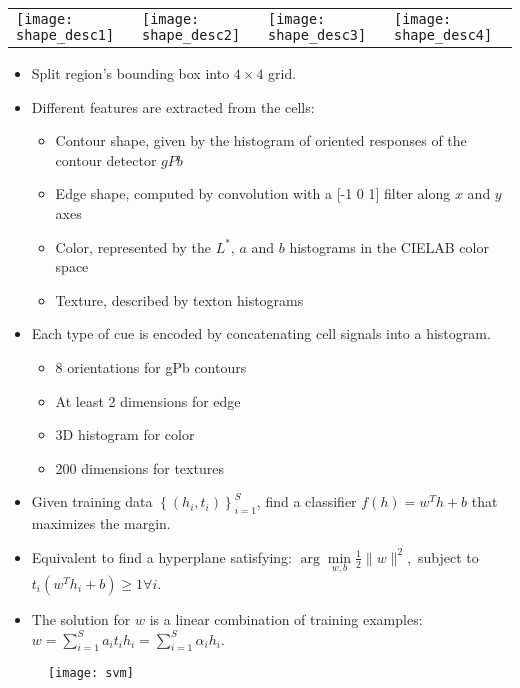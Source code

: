 \documentclass[11pt, a4paper, landscape]{article}
\begin{document}
\NewPage{}
\vfill
\begin{table}
  \centering
  \begin{tabular}{@{} M{.25\linewidth} M{.25\linewidth} M{.25\linewidth} M{.25\linewidth} @{}}
      \texttt{[image: shape\_desc1]}%
      &
      \texttt{[image: shape\_desc2]}%
      &
      \texttt{[image: shape\_desc3]}%
      &
      \texttt{[image: shape\_desc4]}%
  \end{tabular}
\end{table}
\begin{itemize}
\item Split region's bounding box into $4 \times 4$ grid.
\item Different features are extracted from the cells:
\begin{itemize}
\item Contour shape, given by the histogram of oriented responses of the contour detector $gPb$
\item Edge shape, computed by convolution with a [-1 0 1] filter along $x$ and $y$ axes
\item Color, represented by the $L^*$, $a$ and $b$ histograms in the CIELAB color space
\item Texture, described by texton histograms
\end{itemize}
\item Each type of cue is encoded by concatenating cell signals into a histogram.
\begin{itemize}
\item 8 orientations for gPb contours
\item At least 2 dimensions for edge
\item 3D histogram for color
\item 200 dimensions for textures
\end{itemize}
\end{itemize}
\vfill


\NewPage{}
\vfill
\begin{itemize}
\item Given training data $\left\lbrace (h_i, t_i) \right\rbrace _{i = 1} ^S$, find a classifier $f(h) = w^Th + b$ that maximizes the margin.
\vfill
\item Equivalent to find a hyperplane satisfying: $\arg\min\limits_{w, b} \frac{1}{2} \|w\| ^2,$ subject to $t_i(w^Th_i + b) \geq 1 \forall i$.
\vfill
\item The solution for $w$ is a linear combination of training examples: $w = \sum\limits_{i = 1}^{S} a_it_ih_i = \sum\limits_{i = 1}^{S} \alpha_ih_i$.
\end{itemize}
\begin{figure}
	\centering
	\texttt{[image: svm]}
\end{figure}
\vfill
\end{document}

